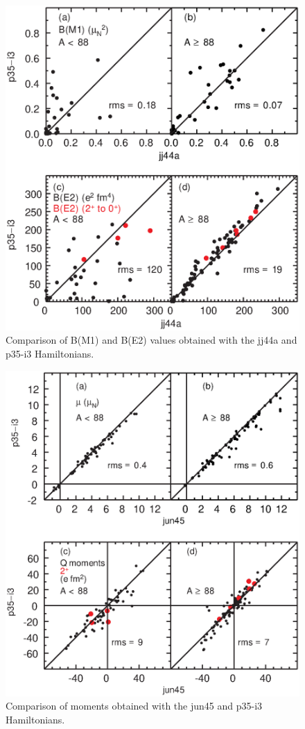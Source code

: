 \documentclass[aps,prl,twocolumn,tightenlines,superscriptaddress,showpacs]{revtex4-1}
\begin{document}
\begin{figure}
\includegraphics[scale=0.40]{ba.eps}
\caption{Comparison of B(M1) and B(E2) values obtained with the
jj44a and p35-i3 Hamiltonians.
}
\label{ (6) }
\end{figure}



\begin{figure}
\includegraphics[scale=0.40]{mh.eps}
\caption{Comparison of  moments obtained with the
jun45 and p35-i3 Hamiltonians.
}
\label{ (7) }
\end{figure}
\end{document}

